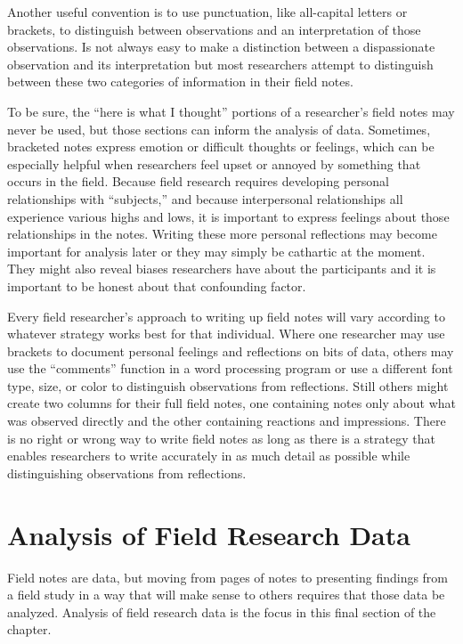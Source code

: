Another useful convention is to use punctuation, like all-capital letters or brackets, to distinguish between observations and an interpretation of those observations. Is not always easy to make a distinction between a dispassionate observation and its interpretation but most researchers attempt to distinguish between these two categories of information in their field notes.

To be sure, the ``here is what I thought'' portions of a researcher's field notes may never be used, but those sections can inform the analysis of data. Sometimes, bracketed notes express emotion or difficult thoughts or feelings, which can be especially helpful when researchers feel upset or annoyed by something that occurs in the field. Because field research requires developing personal relationships with ``subjects,'' and because interpersonal relationships all experience various highs and lows, it is important to express feelings about those relationships in the notes. Writing these more personal reflections may become important for analysis later or they may simply be cathartic at the moment. They might also reveal biases researchers have about the participants and it is important to be honest about that confounding factor.

Every field researcher's approach to writing up field notes will vary according to whatever strategy works best for that individual. Where one researcher may use brackets to document personal feelings and reflections on bits of data, others may use the ``comments'' function in a word processing program or use a different font type, size, or color to distinguish observations from reflections. Still others might create two columns for their full field notes, one containing notes only about what was observed directly and the other containing reactions and impressions. There is no right or wrong way to write field notes as long as there is a strategy that enables researchers to write accurately in as much detail as possible while distinguishing observations from reflections.

\section{Analysis of Field Research Data}

Field notes are data, but moving from pages of notes to presenting findings from a field study in a way that will make sense to others requires that those data be analyzed. Analysis of field research data is the focus in this final section of the chapter.

